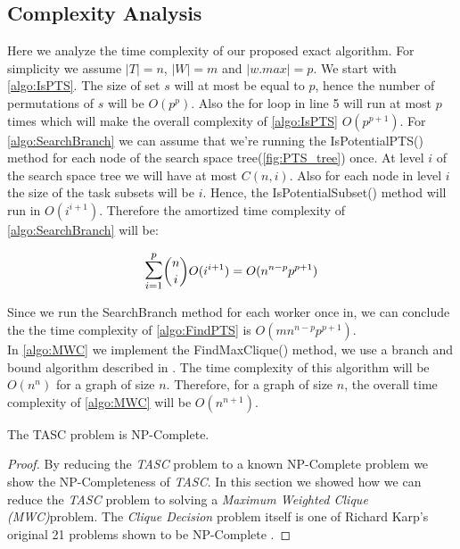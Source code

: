 \subsection{Complexity Analysis}
\label{subsec:exactcomplexity}

Here we analyze the time complexity of our proposed exact algorithm. For simplicity we assume $\left\vert T \right\vert = n$, $\left\vert W \right\vert = m$ and $\left\vert w.max \right\vert = p$. We start with \cref{algo:IsPTS}. The size of set $s$ will at most be equal to $p$, hence the number of permutations of $s$ will be $O(p^p)$. Also the for loop in line 5 will run at most $p$ times which will make the overall complexity of \cref{algo:IsPTS} $O(p^{p+1})$. For \cref{algo:SearchBranch} we can assume that we're running the IsPotentialPTS() method for each node of the search space tree(\cref{fig:PTS_tree}) once. At level $i$ of the search space tree we will have at most $C(n,i)$. Also for each node in level $i$ the size of the task subsets will be $i$. Hence, the IsPotentialSubset() method will run in $O(i^{i+1})$. Therefore the amortized time complexity of \cref{algo:SearchBranch} will be:

\begin{equation*}
\mathlarger{\mathlarger{\sum}}_{i = 1}^{p} \dbinom{n}{i} O(i^{i+1}) = O(n^{n-p}p^{p+1})
\end{equation*}

Since we run the SearchBranch method for each worker once in, we can conclude the the time complexity of \ref{algo:FindPTS} is $O(mn^{n-p}p^{p+1})$.\\

In \cref{algo:MWC} we implement the FindMaxClique() method, we use a branch and bound algorithm described in \cite{Ostergard01}. The time complexity of this algorithm will be $O(n^n)$ for a graph of size $n$. Therefore, for a graph of size $n$, the overall time complexity of \cref{algo:MWC} will be $O(n^{n+1})$.

\begin{theorem}
The TASC problem is NP-Complete.
\end{theorem}

\begin{proof}
By reducing the \emph{TASC} problem to a known NP-Complete problem we show the NP-Completeness of \emph{TASC}. In this section we showed how we can reduce the \emph{TASC} problem to solving a \emph{Maximum Weighted Clique (MWC)}problem. The \emph{Clique Decision} problem itself is one of Richard Karp's original 21 problems shown to be NP-Complete \cite{Karp72}.
\end{proof}

